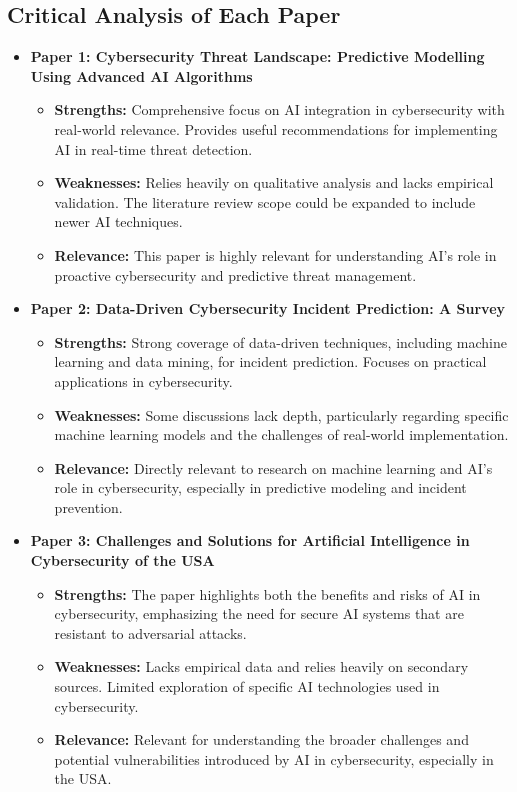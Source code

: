 \documentclass[12pt]{article}
\begin{document}
\subsection{Critical Analysis of Each Paper}

\begin{itemize}
    \item \textbf{Paper 1: Cybersecurity Threat Landscape: Predictive Modelling Using Advanced AI Algorithms} 
    \begin{itemize}
        \item \textbf{Strengths:} Comprehensive focus on AI integration in cybersecurity with real-world relevance. Provides useful recommendations for implementing AI in real-time threat detection.
        \item \textbf{Weaknesses:} Relies heavily on qualitative analysis and lacks empirical validation. The literature review scope could be expanded to include newer AI techniques.
        \item \textbf{Relevance:} This paper is highly relevant for understanding AI’s role in proactive cybersecurity and predictive threat management.
    \end{itemize}
    \item \textbf{Paper 2: Data-Driven Cybersecurity Incident Prediction: A Survey}
    \begin{itemize}
        \item \textbf{Strengths:} Strong coverage of data-driven techniques, including machine learning and data mining, for incident prediction. Focuses on practical applications in cybersecurity.
        \item \textbf{Weaknesses:} Some discussions lack depth, particularly regarding specific machine learning models and the challenges of real-world implementation.
        \item \textbf{Relevance:} Directly relevant to research on machine learning and AI’s role in cybersecurity, especially in predictive modeling and incident prevention.
    \end{itemize}

    \item \textbf{Paper 3: Challenges and Solutions for Artificial Intelligence in Cybersecurity of the USA}
    \begin{itemize}
        \item \textbf{Strengths:} The paper highlights both the benefits and risks of AI in cybersecurity, emphasizing the need for secure AI systems that are resistant to adversarial attacks.
        \item \textbf{Weaknesses:} Lacks empirical data and relies heavily on secondary sources. Limited exploration of specific AI technologies used in cybersecurity.
        \item \textbf{Relevance:} Relevant for understanding the broader challenges and potential vulnerabilities introduced by AI in cybersecurity, especially in the USA.
    \end{itemize}


\end{itemize}
\end{document}
